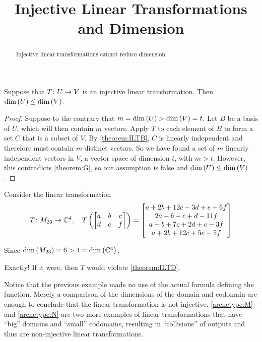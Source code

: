 \documentclass{ximera}
\title{Injective Linear Transformations and Dimension}
\begin{document}
\begin{abstract}
  Injective linear transformations cannot reduce dimension.
\end{abstract}
\maketitle


\begin{theorem}
\label{theorem:ILTD}

Suppose that $T\colon U\rightarrow V$ is an injective linear transformation.  Then $\dim\left(U\right)\leq\dim\left(V\right)$.

\begin{proof}
Suppose to the contrary that $m=\dim\left(U\right)>\dim\left(V\right)=t$.  Let $B$ be  a basis of $U$, which will then contain $m$ vectors.  Apply $T$ to each element of $B$ to form a set $C$ that is a subset of $V$.  By \ref{theorem:ILTB}, $C$ is linearly independent and therefore must contain $m$ distinct vectors.  So we have found a set of $m$ linearly independent vectors in $V$, a vector space of dimension $t$, with $m>t$.  However, this contradicts \ref{theorem:G}, so our assumption is false and $\dim\left(U\right)\leq\dim\left(V\right)$.

\end{proof}
\end{theorem}

\begin{example}

Consider the linear transformation 
\[T\colon M_{23}\rightarrow\mathbb{C}^{4},\quad
T\left(\begin{bmatrix}a&b&c\\d&e&f\end{bmatrix}\right)=
\begin{bmatrix}a+2b+12c-3d+e+6f\\2a-b-c+d-11f\\a+b+7c+2d+e-3f\\a+2b+12c+5e-5f\end{bmatrix}
\]


Since $\dim\left(M_{23}\right)=6>4=\dim\left(\mathbb{C}^{4}\right)$, 
\begin{multipleChoice}
\end{multipleChoice}
\begin{feedback}[correct]
Exactly!  If it were, then $T$ would violate \ref{theorem:ILTD}.
\end{feedback}

\end{example}

Notice that the previous example made no use of the actual formula defining the function.  Merely a comparison of the dimensions of the domain and codomain are enough to conclude that the linear transformation is not injective.  \ref{archetype:M} and \ref{archetype:N} are two more examples of linear transformations that have ``big'' domains and ``small'' codomains, resulting in ``collisions'' of outputs and thus are non-injective linear transformations.
\end{document}
